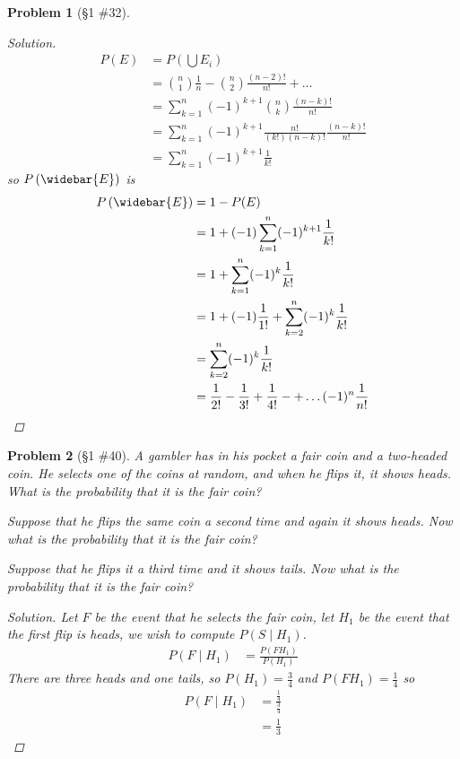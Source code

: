 \documentclass[11pt, oneside]{book}   	%
\newtheorem{problem}{Problem}[chapter]
\begin{document}
\begin{spacing}{1.618}
\begin{problem}[\S 1 \#32]
\begin{proof}[Solution]
		\begin{alignat*}{4}
			P(E)&=P\left(\bigcup E_i\right) \\
				&=\binom{n}{1}\frac{1}{n}-\binom{n}{2}\frac{(n-2)!}{n!}+\dots \\
				&=\sum_{k=1}^n (-1)^{k+1}\binom{n}{k}\frac{(n-k)!}{n!} \\
				&=\sum_{k=1}^n(-1)^{k+1} \frac{n!}{(k!)(n-k)!}\frac{(n-k)!}{n!} \\
				&=\sum_{k=1}^n(-1)^{k+1}\frac{1}{k!}
		\end{alignat*}
		so $P\left(\widebar{E}\right)$ is 
		\begin{alignat*}{4}
			P\left(\widebar{E}\right)&=1-P(E) \\
				&=1+(-1)\sum_{k=1}^n(-1)^{k+1}\frac{1}{k!} \\
				&=1+\sum_{k=1}^n(-1)^k\frac{1}{k!} \\
				&=1+(-1)\frac{1}{1!}+\sum_{k=2}^n(-1)^k\frac{1}{k!} \\
				&=\sum_{k=2}^n(-1)^k\frac{1}{k!} \\
				&=\frac{1}{2!}-\frac{1}{3!}+\frac{1}{4!} -+ \dots (-1)^n\frac{1}{n!}
		\end{alignat*}
	\end{proof}
\end{problem}


\begin{problem}[\S 1 \#40]
	A gambler has in his pocket a fair coin and a two-headed coin. He selects one of the coins at random, and when he flips it, it shows heads. What is the probability that it is the fair coin? 
	
	Suppose that he flips the same coin a second time and again it shows heads. Now what is the probability that it is the fair coin? 
	
	Suppose that he flips it a third time and it shows tails. Now what is the probability that it is the fair coin? 
	
	\begin{proof}[Solution]
		Let $F$ be the event that he selects the fair coin, let $H_1$ be the event that the first flip is heads, we wish to compute $P(S\mid H_1)$. 
		\begin{alignat*}{4}
			P(F\mid H_1)&=\frac{P(F H_1)}{P(H_1)}
		\end{alignat*}
		There are three heads and one tails, so $P(H_1)=\frac{3}{4}$ and $P(F H_1)=\frac{1}{4}$ so 
		\begin{alignat*}{4}
			P(F\mid H_1)&=\frac{\frac{1}{4}}{\frac{3}{4}} \\
				&=\frac{1}{3}
		\end{alignat*}
	

\end{proof}
\end{problem}
\end{spacing}
\end{document}

